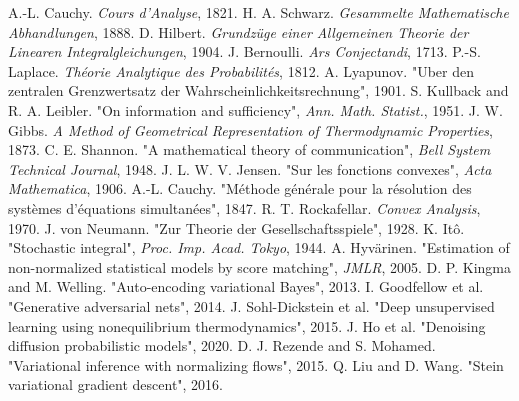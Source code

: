 \documentclass[11pt]{book}
\begin{document}

\begin{thebibliography}{99}
 A.-L. Cauchy. \emph{Cours d'Analyse}, 1821.
 H. A. Schwarz. \emph{Gesammelte Mathematische Abhandlungen}, 1888.
 D. Hilbert. \emph{Grundzüge einer Allgemeinen Theorie der Linearen Integralgleichungen}, 1904.
 J. Bernoulli. \emph{Ars Conjectandi}, 1713.
 P.-S. Laplace. \emph{Théorie Analytique des Probabilités}, 1812.
 A. Lyapunov. "Uber den zentralen Grenzwertsatz der Wahrscheinlichkeitsrechnung", 1901.
 S. Kullback and R. A. Leibler. "On information and sufficiency", \emph{Ann. Math. Statist.}, 1951.
 J. W. Gibbs. \emph{A Method of Geometrical Representation of Thermodynamic Properties}, 1873.
 C. E. Shannon. "A mathematical theory of communication", \emph{Bell System Technical Journal}, 1948.
 J. L. W. V. Jensen. "Sur les fonctions convexes", \emph{Acta Mathematica}, 1906.
 A.-L. Cauchy. "Méthode générale pour la résolution des systèmes d'équations simultanées", 1847.
 R. T. Rockafellar. \emph{Convex Analysis}, 1970.
 J. von Neumann. "Zur Theorie der Gesellschaftsspiele", 1928.
 K. Itô. "Stochastic integral", \emph{Proc. Imp. Acad. Tokyo}, 1944.
 A. Hyvärinen. "Estimation of non-normalized statistical models by score matching", \emph{JMLR}, 2005.
 D. P. Kingma and M. Welling. "Auto-encoding variational Bayes", 2013.
 I. Goodfellow et al. "Generative adversarial nets", 2014.
 J. Sohl-Dickstein et al. "Deep unsupervised learning using nonequilibrium thermodynamics", 2015.
 J. Ho et al. "Denoising diffusion probabilistic models", 2020.
 D. J. Rezende and S. Mohamed. "Variational inference with normalizing flows", 2015.
 Q. Liu and D. Wang. "Stein variational gradient descent", 2016.
\end{thebibliography}
\end{document}
